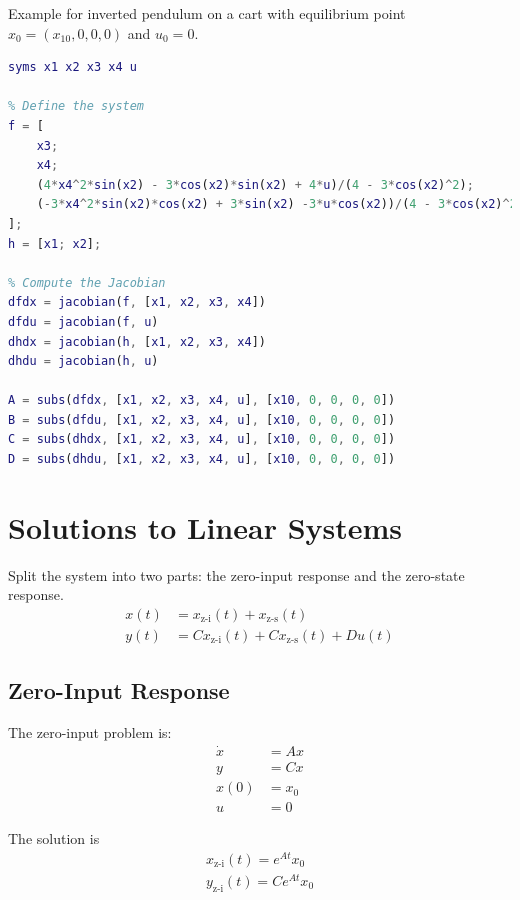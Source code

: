 \documentclass[letterpaper,12pt]{article}
\begin{document}
Example for inverted pendulum on a cart with equilibrium point $x_0 = (x_10, 0,
0, 0)$ and $u_0 = 0$.
\begin{lstlisting}[language=Matlab]
% Declare symbolic variables
syms x1 x2 x3 x4 u

% Define the system
f = [
    x3;
    x4;
    (4*x4^2*sin(x2) - 3*cos(x2)*sin(x2) + 4*u)/(4 - 3*cos(x2)^2);
    (-3*x4^2*sin(x2)*cos(x2) + 3*sin(x2) -3*u*cos(x2))/(4 - 3*cos(x2)^2);
];
h = [x1; x2];

% Compute the Jacobian
dfdx = jacobian(f, [x1, x2, x3, x4])
dfdu = jacobian(f, u)
dhdx = jacobian(h, [x1, x2, x3, x4])
dhdu = jacobian(h, u)

A = subs(dfdx, [x1, x2, x3, x4, u], [x10, 0, 0, 0, 0])
B = subs(dfdu, [x1, x2, x3, x4, u], [x10, 0, 0, 0, 0])
C = subs(dhdx, [x1, x2, x3, x4, u], [x10, 0, 0, 0, 0])
D = subs(dhdu, [x1, x2, x3, x4, u], [x10, 0, 0, 0, 0])
\end{lstlisting}

\section{Solutions to Linear Systems}
Split the system into two parts: the zero-input response and the zero-state
response. 
\begin{align*}
    x(t) &= x_{\text{z-i}}(t) + x_{\text{z-s}}(t) \\
    y(t) &= C x_{\text{z-i}}(t) + C x_{\text{z-s}}(t) + Du(t)
\end{align*}

\subsection{Zero-Input Response}
The zero-input problem is:
\begin{align*}
    \dot{x} &= Ax \\
    y &= Cx\\ 
    x(0) &= x_0 \\
    u &= 0
\end{align*}

The solution is
\begin{align*}
    x_{\text{z-i}}(t) = e^{At}x_0 \\
    y_{\text{z-i}}(t) = Ce^{At}x_0
\end{align*}
\end{document}
